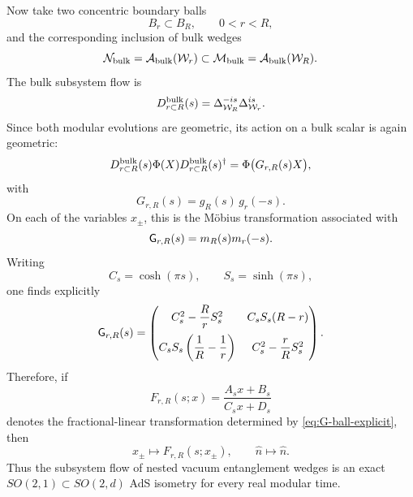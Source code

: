 \documentclass[a4paper,11pt]{article}
\theoremstyle{definition}
\begin{document}
Now take two concentric boundary balls
\begin{equation}
    B_r\subset B_R,
    \qquad
    0<r<R,
\end{equation}
and the corresponding inclusion of bulk wedges
\begin{equation}
    \mathcal N_{\rm bulk}
    =
    \mathcal A_{\rm bulk}(\mathcal W_r)
    \subset
    \mathcal M_{\rm bulk}
    =
    \mathcal A_{\rm bulk}(\mathcal W_R).
\end{equation}
The bulk subsystem flow is
\begin{equation}
    D^{\rm bulk}_{r\subset R}(s)
    =
    \Delta_{\mathcal W_R}^{-is}
    \Delta_{\mathcal W_r}^{is}.
    \label{eq:bulk-subsystem-flow-def}
\end{equation}
Since both modular evolutions are geometric, its action on a bulk scalar
is again geometric:
\begin{equation}
    D^{\rm bulk}_{r\subset R}(s)
    \Phi(X)
    D^{\rm bulk}_{r\subset R}(s)^\dagger
    =
    \Phi\bigl(G_{r,R}(s)X\bigr),
    \label{eq:bulk-subsystem-geometric}
\end{equation}
with
\begin{equation}
    G_{r,R}(s)
    =
    g_R(s)\,g_r(-s).
    \label{eq:G-bulk-composition}
\end{equation}
On each of the variables $x_\pm$, this is the M\"obius transformation
associated with
\begin{equation}
    {\sf G}_{r,R}(s)
    =
    m_R(s)m_r(-s).
    \label{eq:G-matrix-def}
\end{equation}
Writing
\begin{equation}
    C_s=\cosh(\pi s),
    \qquad
    S_s=\sinh(\pi s),
\end{equation}
one finds explicitly
\begin{equation}
    {\sf G}_{r,R}(s)
    =
    \begin{pmatrix}
      C_s^2-\dfrac{R}{r}S_s^2
      &
      C_sS_s(R-r)
      \\[3mm]
      C_sS_s\left(\dfrac1R-\dfrac1r\right)
      &
      C_s^2-\dfrac{r}{R}S_s^2
    \end{pmatrix}.
    \label{eq:G-ball-explicit}
\end{equation}
Therefore, if
\begin{equation}
    F_{r,R}(s;x)
    =
    \frac{
        A_sx+B_s
    }{
        C_s^{\phantom{2}}x+D_s
    }
\end{equation}
denotes the fractional-linear transformation determined by
\eqref{eq:G-ball-explicit}, then
\begin{equation}
    x_\pm
    \longmapsto
    F_{r,R}(s;x_\pm),
    \qquad
    \widehat n\longmapsto\widehat n.
    \label{eq:bulk-subsystem-final-real}
\end{equation}
Thus the subsystem flow of nested vacuum entanglement wedges is an exact
$SO(2,1)\subset SO(2,d)$ AdS isometry for every real modular time.
\end{document}
